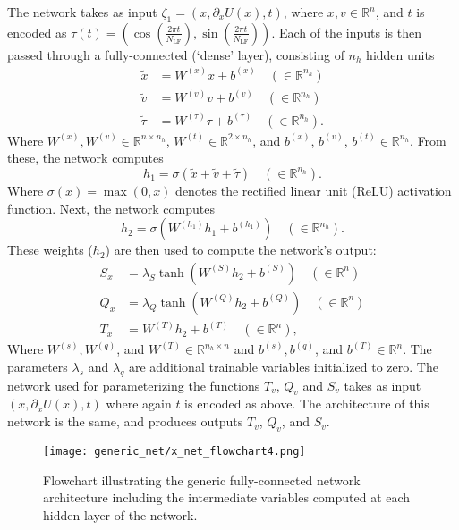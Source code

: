 The network takes as input $\zeta_1 = (x, \partial_{x} U(x), t)$, where $x, v
\in \mathbb{R}^{n}$, and $t$ is encoded as $\tau(t) = \left(\cos{(\frac{2\pi
t}{N_{\mathrm{LF}}})},\right.  \left.\sin{(\frac{2\pi
t}{N_{\mathrm{LF}}})}\right)$.
%
Each of the inputs is then passed through a fully-connected (`dense' layer),
consisting of $n_h$ hidden units
%
\begin{align}
    \tilde x &= W^{(x)} x + b^{(x)} \quad (\in \mathbb{R}^{n_h})\\
    \tilde v &= W^{(v)} v + b^{(v)} \quad (\in \mathbb{R}^{n_h})\\
    \tilde \tau &= W^{(\tau)} \tau + b^{(\tau)} \quad (\in \mathbb{R}^{n_h}).
\end{align}
%
Where $W^{(x)}, W^{(v)} \in \mathbb{R}^{n \times n_h}$, $W^{(t)} \in
\mathbb{R}^{2 \times n_h}$, and $b^{(x)}$, $b^{(v)}$,  $b^{(t)} \in
\mathbb{R}^{n_h}$.
%
From these, the network computes
%
\begin{equation}
    h_1 = \sigma(\tilde x + \tilde v + \tilde \tau) \quad (\in
    \mathbb{R}^{n_h}).
    \label{eq:hidden_1}
\end{equation}
%
Where $\sigma(x) = \max(0, x)$ denotes the rectified linear unit (ReLU)
activation function.
%
Next, the network computes
%
\begin{equation}
    h_2 = \sigma\left(W^{(h_1)} h_1 + b^{(h_1)}\right) \quad (\in
    \mathbb{R}^{n_h}).
    \label{eq:hidden_2}
\end{equation}
%
These weights ($h_2$) are then used to compute the network's output:
%
\begin{align}
    S_x &= \lambda_S \tanh(W^{(S)} h_2 + b^{(S)})\quad (\in \mathbb{R}^{n})\\
    Q_x &= \lambda_{Q} \tanh(W^{(Q)} h_2 + b^{(Q)})\quad (\in \mathbb{R}^{n})\\
    T_x &= W^{(T)} h_2 + b^{(T)}\quad (\in \mathbb{R}^{n}),
\end{align}
%
Where $W^{(s)}, W^{(q)}$, and $W^{(T)} \in \mathbb{R}^{n_h \times n}$ and
$b^{(s)}, b^{(q)}$, and $b^{(T)} \in \mathbb{R}^{n}$.
%
The parameters $\lambda_s$ and $\lambda_q$ are additional trainable variables
initialized to zero.
%
The network used for parameterizing the functions $T_v$, $Q_v$ and $S_v$ takes
as input $(x, \partial_x U(x), t)$ where again $t$ is encoded as above.  The
architecture of this network is the same, and produces outputs $T_v$, $Q_v$,
and $S_v$.

\begin{figure}[htpb]
  \centering
  \texttt{[image: generic\_net/x\_net\_flowchart4.png]}
  \caption{Flowchart illustrating the generic fully-connected network
    architecture including the intermediate variables computed at each hidden
    layer of the network.}%
\label{fig:x_net_flowchart}
\end{figure}

%
